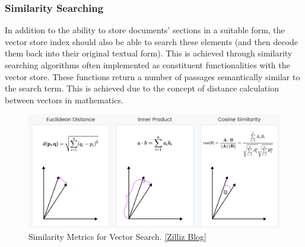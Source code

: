\subsubsection{Similarity Searching}
In addition to the ability to store documents' sections in a suitable form, the vector store index should also be able to search these elements (and then decode them back into their original textual form). This is achieved through similarity searching algorithms often implemented as constituent functionalities with the vector store. These functions return a number of passages semantically similar to the search term. This is achieved due to the concept of distance calculation between vectors in mathematics.
\begin{figure}[htbp]
    \centering
    \includegraphics[width=\linewidth]{./figures/vector-distance-metrics.png}
    \caption{Similarity Metrics for Vector Search. \href{https://zilliz.com/blog/similarity-metrics-for-vector-search}{[Zilliz Blog]}}
\end{figure}
\newpage

